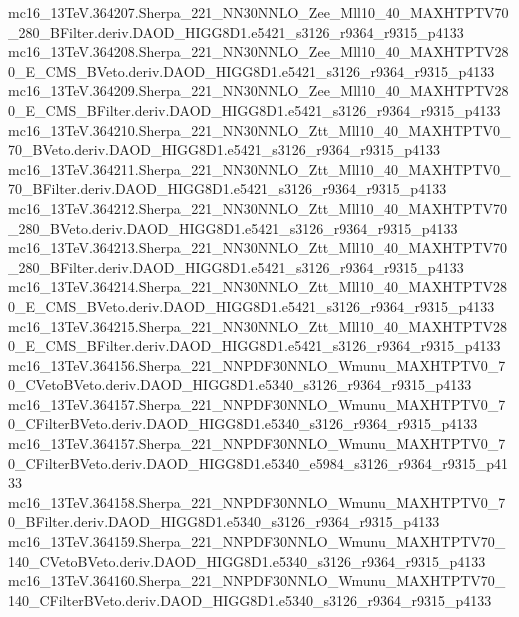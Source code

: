 \begin{footnotesize}
mc16\_13TeV.364207.Sherpa\_221\_NN30NNLO\_Zee\_Mll10\_40\_MAXHTPTV70\_280\_BFilter.deriv.DAOD\_HIGG8D1.e5421\_s3126\_r9364\_r9315\_p4133 \\
mc16\_13TeV.364208.Sherpa\_221\_NN30NNLO\_Zee\_Mll10\_40\_MAXHTPTV280\_E\_CMS\_BVeto.deriv.DAOD\_HIGG8D1.e5421\_s3126\_r9364\_r9315\_p4133 \\
mc16\_13TeV.364209.Sherpa\_221\_NN30NNLO\_Zee\_Mll10\_40\_MAXHTPTV280\_E\_CMS\_BFilter.deriv.DAOD\_HIGG8D1.e5421\_s3126\_r9364\_r9315\_p4133 \\
mc16\_13TeV.364210.Sherpa\_221\_NN30NNLO\_Ztt\_Mll10\_40\_MAXHTPTV0\_70\_BVeto.deriv.DAOD\_HIGG8D1.e5421\_s3126\_r9364\_r9315\_p4133 \\
mc16\_13TeV.364211.Sherpa\_221\_NN30NNLO\_Ztt\_Mll10\_40\_MAXHTPTV0\_70\_BFilter.deriv.DAOD\_HIGG8D1.e5421\_s3126\_r9364\_r9315\_p4133 \\
mc16\_13TeV.364212.Sherpa\_221\_NN30NNLO\_Ztt\_Mll10\_40\_MAXHTPTV70\_280\_BVeto.deriv.DAOD\_HIGG8D1.e5421\_s3126\_r9364\_r9315\_p4133 \\
mc16\_13TeV.364213.Sherpa\_221\_NN30NNLO\_Ztt\_Mll10\_40\_MAXHTPTV70\_280\_BFilter.deriv.DAOD\_HIGG8D1.e5421\_s3126\_r9364\_r9315\_p4133 \\
mc16\_13TeV.364214.Sherpa\_221\_NN30NNLO\_Ztt\_Mll10\_40\_MAXHTPTV280\_E\_CMS\_BVeto.deriv.DAOD\_HIGG8D1.e5421\_s3126\_r9364\_r9315\_p4133 \\
mc16\_13TeV.364215.Sherpa\_221\_NN30NNLO\_Ztt\_Mll10\_40\_MAXHTPTV280\_E\_CMS\_BFilter.deriv.DAOD\_HIGG8D1.e5421\_s3126\_r9364\_r9315\_p4133 \\
mc16\_13TeV.364156.Sherpa\_221\_NNPDF30NNLO\_Wmunu\_MAXHTPTV0\_70\_CVetoBVeto.deriv.DAOD\_HIGG8D1.e5340\_s3126\_r9364\_r9315\_p4133 \\
mc16\_13TeV.364157.Sherpa\_221\_NNPDF30NNLO\_Wmunu\_MAXHTPTV0\_70\_CFilterBVeto.deriv.DAOD\_HIGG8D1.e5340\_s3126\_r9364\_r9315\_p4133 \\
mc16\_13TeV.364157.Sherpa\_221\_NNPDF30NNLO\_Wmunu\_MAXHTPTV0\_70\_CFilterBVeto.deriv.DAOD\_HIGG8D1.e5340\_e5984\_s3126\_r9364\_r9315\_p4133 \\
mc16\_13TeV.364158.Sherpa\_221\_NNPDF30NNLO\_Wmunu\_MAXHTPTV0\_70\_BFilter.deriv.DAOD\_HIGG8D1.e5340\_s3126\_r9364\_r9315\_p4133 \\
mc16\_13TeV.364159.Sherpa\_221\_NNPDF30NNLO\_Wmunu\_MAXHTPTV70\_140\_CVetoBVeto.deriv.DAOD\_HIGG8D1.e5340\_s3126\_r9364\_r9315\_p4133 \\
mc16\_13TeV.364160.Sherpa\_221\_NNPDF30NNLO\_Wmunu\_MAXHTPTV70\_140\_CFilterBVeto.deriv.DAOD\_HIGG8D1.e5340\_s3126\_r9364\_r9315\_p4133 \\

\end{footnotesize}
